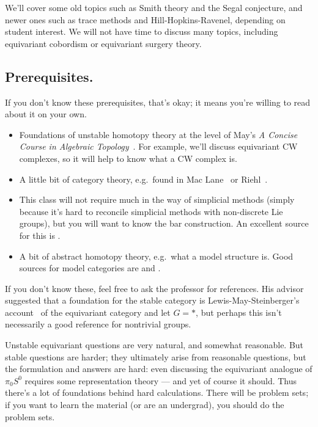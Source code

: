 We'll cover some old topics such as Smith theory and the Segal conjecture, and newer ones such as trace methods
and Hill-Hopkins-Ravenel, depending on student interest. We will not have time to discuss many topics, including
equivariant cobordism or equivariant surgery theory.
\subsection*{Prerequisites.} If you don't know these prerequisites, that's okay; it means you're willing to read
about it on your own.
\begin{itemize}
	\item Foundations of unstable homotopy theory at the level of May's \textit{A Concise Course in Algebraic
	Topology}~\cite{ConciseCourse}. For example, we'll discuss equivariant CW complexes, so it will help to know
	what a CW complex is.
	\item A little bit of category theory, e.g.\ found in Mac Lane~\cite{MacLane} or Riehl~\cite{RiehlCTC}.
	\item This class will not require much in the way of simplicial methods (simply because it's hard to reconcile
	simplicial methods with non-discrete Lie groups), but you will want to know the bar construction. An excellent source for this is \cite[Chapter 4]{RiehlCHT}.
	\item A bit of abstract homotopy theory, e.g.\ what a model structure is. Good sources for model categories are \cite[Part III]{RiehlCHT} and \cite{Hovey}.
\end{itemize}
If you don't know these, feel free to ask the professor for references. His advisor suggested that a foundation for
the stable category is Lewis-May-Steinberger's account~\cite{LMS} of the equivariant category and let $G = *$, but
perhaps this isn't necessarily a good reference for nontrivial groups.

Unstable equivariant questions are very natural, and somewhat reasonable. But stable questions are harder; they
ultimately arise from reasonable questions, but the formulation and answers are hard: even discussing the
equivariant analogue of $\pi_0S^0$ requires some representation theory --- and yet of course it should. Thus
there's a lot of foundations behind hard calculations. There will be problem sets; if you want to learn the
material (or are an undergrad), you should do the problem sets.
